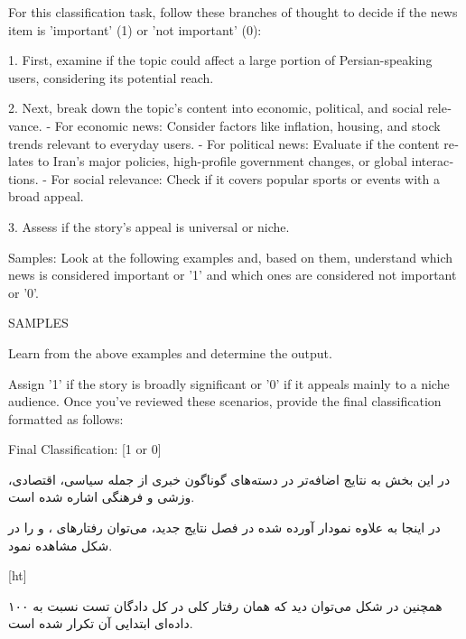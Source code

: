 \vspace{5pt}
\begin{scriptsize}
\begin{itshape}
\begin{latin}
\LTR
For this classification task, follow these branches of thought to decide if the news item is 'important' (1) or 'not important' (0):

1. First, examine if the topic could affect a large portion of Persian-speaking users, considering its potential reach.

2. Next, break down the topic's content into economic, political, and social relevance.
   - For economic news: Consider factors like inflation, housing, and stock trends relevant to everyday users.
   - For political news: Evaluate if the content relates to Iran’s major policies, high-profile government changes, or global interactions.
   - For social relevance: Check if it covers popular sports or events with a broad appeal.

3. Assess if the story’s appeal is universal or niche.

Samples: Look at the following examples and, based on them, understand which news is considered important or '1' and which ones are considered not important or '0'.

SAMPLES

Learn from the above examples and determine the output.

Assign '1' if the story is broadly significant or '0' if it appeals mainly to a niche audience. Once you’ve reviewed these scenarios, provide the final classification formatted as follows:

Final Classification: [1 or 0]
\RTL
\end{latin}
\end{itshape}
\end{scriptsize}
\vspace{5pt}

در این بخش به نتایج اضافه‌تر در دسته‌های گوناگون خبری از جمله سیاسی، اقتصادی، وزشی و فرهنگی اشاره شده است.

در اینجا به علاوه نمودار آورده شده در فصل نتایج جدید، می‌توان رفتارهای
 ، 
 و
را در شکل  مشاهده نمود.

[ht]

همچنین در شکل  می‌توان دید که همان رفتار کلی در کل دادگان تست نسبت به ۱۰۰ داده‌ای ابتدایی آن تکرار شده است.

